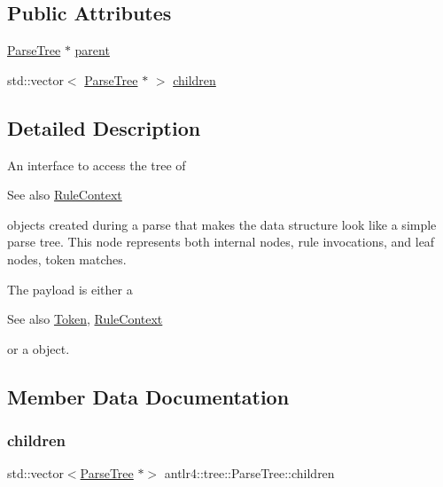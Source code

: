 \subsection*{Public Attributes}
\begin{DoxyCompactItemize}
\item 
\hyperlink{classantlr4_1_1tree_1_1ParseTree}{Parse\+Tree} $\ast$ \hyperlink{classantlr4_1_1tree_1_1ParseTree_a83402632670316b68280c04e6be70d50}{parent}
\item 
std\+::vector$<$ \hyperlink{classantlr4_1_1tree_1_1ParseTree}{Parse\+Tree} $\ast$ $>$ \hyperlink{classantlr4_1_1tree_1_1ParseTree_aad52b12c9e03c4a117e1ac00bba74073}{children}
\end{DoxyCompactItemize}


\subsection{Detailed Description}
An interface to access the tree of \begin{DoxySeeAlso}{See also}
\hyperlink{classantlr4_1_1RuleContext}{Rule\+Context}


\end{DoxySeeAlso}
objects created during a parse that makes the data structure look like a simple parse tree. This node represents both internal nodes, rule invocations, and leaf nodes, token matches.

The payload is either a \begin{DoxySeeAlso}{See also}
\hyperlink{classantlr4_1_1Token}{Token}, \hyperlink{classantlr4_1_1RuleContext}{Rule\+Context}


\end{DoxySeeAlso}
or a  object. 

\subsection{Member Data Documentation}
\mbox{\label{classantlr4_1_1tree_1_1ParseTree_aad52b12c9e03c4a117e1ac00bba74073}} 
\subsubsection{\texorpdfstring{children}{children}}
{\footnotesize\ttfamily std\+::vector$<$\hyperlink{classantlr4_1_1tree_1_1ParseTree}{Parse\+Tree} $\ast$$>$ antlr4\+::tree\+::\+Parse\+Tree\+::children}

